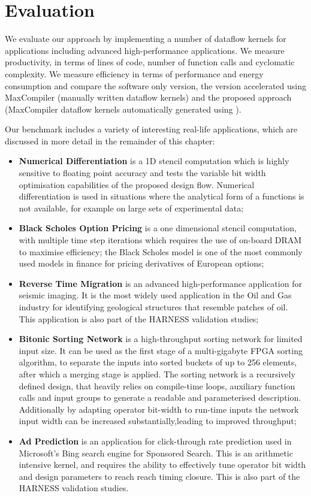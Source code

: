 \chapter{Evaluation}
\label{sec:evaluation}

We evaluate our approach by implementing a number of dataflow kernels
for applications including advanced high-performance applications. We
measure productivity, in terms of lines of code, number of function
calls and cyclomatic complexity. We measure efficiency in terms of
performance and energy consumption and compare the software only
version, the version accelerated using MaxCompiler (manually written
dataflow kernels) and the proposed approach (MaxCompiler dataflow
kernels automatically generated using \fastc{}).

\label{sec:benchmark}

Our benchmark includes a variety of interesting real-life
applications, which are discussed in more detail in the remainder of
this chapter:
\begin{itemize}
\item \textbf{Numerical Differentiation} is a 1D stencil computation which
  is highly sensitive to floating point accuracy and tests the
  variable bit width optimisation capabilities of the proposed design
  flow. Numerical differentiation is used in situations where the
  analytical form of a functions is not available, for example on
  large sets of experimental data;
\item \textbf{Black Scholes Option Pricing} is a one dimensional
    stencil computation, with multiple time step iterations which
    requires the use of on-board DRAM to maximise efficiency; the Black
    Scholes model is one of the most commonly used models in finance for
    pricing derivatives of European options;
\item \textbf{Reverse Time Migration} is an advanced high-performance
  application for seismic imaging. It is the most widely used
  application in the Oil and Gas industry for identifying geological
  structures that resemble patches of oil. This application is also
  part of the HARNESS validation studies;
\item \textbf{Bitonic Sorting Network} is a high-throughput sorting
  network for limited input size. It can be used as the first stage of
  a multi-gigabyte FPGA sorting algorithm, to separate the inputs into
  sorted buckets of up to 256 elements, after which a merging stage is
  applied. The sorting network is a recursively defined design, that
  heavily relies on compile-time loops, auxiliary function calls and
  input groups to generate a readable and parameterised
  description. Additionally by adapting operator bit-width to run-time
  inputs the network input width can be increased
  substantially,leading to improved throughput;
\item \textbf{Ad Prediction} is an application for click-through rate
  prediction used in Microsoft's Bing search engine for Sponsored
  Search. This is an arithmetic intensive kernel, and requires the
  ability to effectively tune operator bit width and design parameters
  to reach reach timing closure. This is also part of the HARNESS
  validation studies.
\end{itemize}

